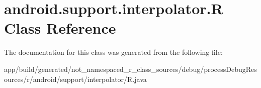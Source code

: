 \hypertarget{classandroid_1_1support_1_1interpolator_1_1_r}{}\section{android.\+support.\+interpolator.\+R Class Reference}
\label{classandroid_1_1support_1_1interpolator_1_1_r}


The documentation for this class was generated from the following file\+:\begin{DoxyCompactItemize}
\item 
app/build/generated/not\+\_\+namespaced\+\_\+r\+\_\+class\+\_\+sources/debug/process\+Debug\+Resources/r/android/support/interpolator/R.\+java\end{DoxyCompactItemize}
